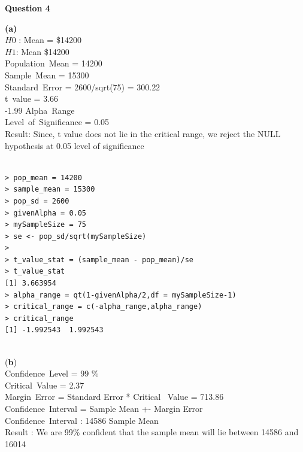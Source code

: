 \documentclass[12pt,letterpaper]{article}
\begin{document}
{\Large \textbf{Question 4}}

{\textbf{(a)}} \\
$H0$ : Mean = \$14200\\
            $H1$: Mean \ne \$14200 
            \\
            Population\ Mean = 14200\\
            Sample\ Mean = 15300\\
            Standard\ Error = 2600/sqrt(75) = 300.22\\
            t\ value = 3.66\\
           -1.99 \leq Alpha\ Range \\
            Level\ of\ Significance = 0.05\\
            
            Result: Since, t value  does  not  lie  in the critical range, 
            we reject the NULL hypothesis at 0.05 level of significance\\ 
             
           \begin{lstlisting}[label=R Code,caption=Q4(a) R Code Output]
      
> pop_mean = 14200
> sample_mean = 15300
> pop_sd = 2600
> givenAlpha = 0.05
> mySampleSize = 75
> se <- pop_sd/sqrt(mySampleSize)
> 
> t_value_stat = (sample_mean - pop_mean)/se
> t_value_stat
[1] 3.663954
> alpha_range = qt(1-givenAlpha/2,df = mySampleSize-1)
> critical_range = c(-alpha_range,alpha_range)
> critical_range
[1] -1.992543  1.992543
          
\end{lstlisting}

{(\textbf{b})}  \\
Confidence\ Level = 99 \%\\
Critical\ Value = 2.37 \\
Margin\ Error = Standard Error * Critical \ Value = 713.86 \\
Confidence\ Interval = Sample Mean +- Margin Error\\
Confidence\ Interval : 14586 \leq Sample Mean \\

Result : We are 99\% confident that the sample mean will lie between 14586 and 16014\\
\\
\end{document}
